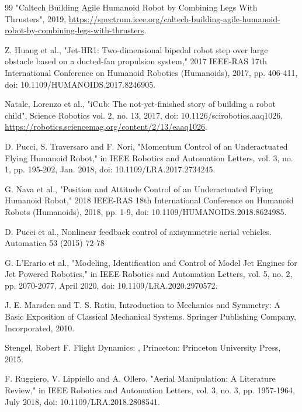 \begin{thebibliography}{99}
 "Caltech Building Agile Humanoid Robot by Combining Legs With Thrusters", 2019, \url{https://spectrum.ieee.org/caltech-building-agile-humanoid-robot-by-combining-legs-with-thrusters}.


 Z. Huang et al., "Jet-HR1: Two-dimensional bipedal robot step over large obstacle based on a ducted-fan propulsion system," 2017 IEEE-RAS 17th International Conference on Humanoid Robotics (Humanoids), 2017, pp. 406-411, doi: 10.1109/HUMANOIDS.2017.8246905.

 Natale, Lorenzo et al., "iCub: The not-yet-finished story of building a robot child", Science Robotics vol. 2, no. 13, 2017, doi: 10.1126/scirobotics.aaq1026, \url{https://robotics.sciencemag.org/content/2/13/eaaq1026}.

 D. Pucci, S. Traversaro and F. Nori, "Momentum Control of an Underactuated Flying Humanoid Robot," in IEEE Robotics and Automation Letters, vol. 3, no. 1, pp. 195-202, Jan. 2018, doi: 10.1109/LRA.2017.2734245.

 G. Nava et al., "Position and Attitude Control of an Underactuated Flying Humanoid Robot," 2018 IEEE-RAS 18th International Conference on Humanoid Robots (Humanoids), 2018, pp. 1-9, doi: 10.1109/HUMANOIDS.2018.8624985.

 D. Pucci et al., Nonlinear feedback control of axisymmetric aerial vehicles.   Automatica 53 (2015) 72-78

 G. L’Erario et al., "Modeling, Identification and Control of Model Jet Engines for Jet Powered Robotics," in IEEE Robotics and Automation Letters, vol. 5, no. 2, pp. 2070-2077, April 2020, doi: 10.1109/LRA.2020.2970572.

 J. E. Marsden and T. S. Ratiu, Introduction to Mechanics and Symmetry: A Basic Exposition of Classical Mechanical Systems.   Springer Publishing Company, Incorporated, 2010.

 Stengel, Robert F. Flight Dynamics: , Princeton: Princeton University Press, 2015.

 F. Ruggiero, V. Lippiello and A. Ollero, "Aerial Manipulation: A Literature Review," in IEEE Robotics and Automation Letters, vol. 3, no. 3, pp. 1957-1964, July 2018, doi: 10.1109/LRA.2018.2808541.


\end{thebibliography}
